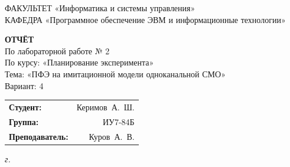 \begin{titlepage}
	{\doublespacing\small\raggedright
		ФАКУЛЬТЕТ \hspace{28mm} «Информатика и системы управления» \\
		КАФЕДРА \hspace{9mm} «Программное обеспечение ЭВМ и информационные технологии» \\
	}

	\vspace{30mm}

	\textbf{ОТЧЁТ} \\
	По лабораторной работе № 2 \\
	По курсу: «Планирование эксперимента» \\
	Тема: «ПФЭ на имитационной модели одноканальной СМО» \\
	Вариант: 4

	\vspace{40mm}

	\begin{flushleft}
		\begin{tabular}{lr}
			\textbf{Студент:}        & Керимов~А.~Ш. \\
			\textbf{Группа:}         & ИУ7-84Б       \\
			\textbf{Преподаватель:}  & Куров~А.~В.   \\
		\end{tabular}
	\end{flushleft}

	\vfill

	\textit{{\the\year} г.}
\end{titlepage}

\setcounter{page}{2}
